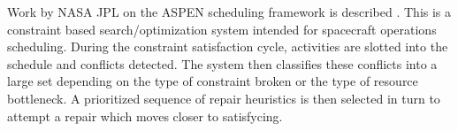 \documentclass[12pt,a4paper]{article}
\begin{document}

Work by NASA JPL on the ASPEN scheduling framework is described \citep{rabideau99iterative}. This is a constraint based search/optimization system intended for spacecraft operations scheduling. During the constraint satisfaction cycle, activities are slotted into the schedule and conflicts detected. The system then classifies these conflicts into a large set depending on the type of constraint broken or the type of resource bottleneck. A prioritized sequence of repair heuristics is then selected in turn to attempt a repair which moves closer to satisfycing.

\end{document}
